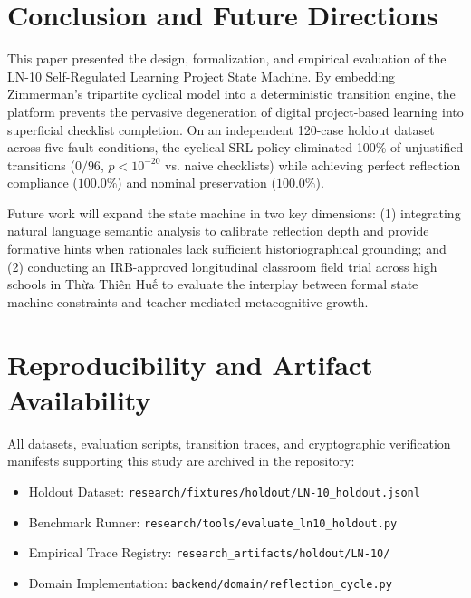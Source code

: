 \documentclass[11pt,a4paper]{article}
\begin{document}
\section{Conclusion and Future Directions}

This paper presented the design, formalization, and empirical evaluation of the LN-10 Self-Regulated Learning Project State Machine. By embedding Zimmerman's tripartite cyclical model into a deterministic transition engine, the platform prevents the pervasive degeneration of digital project-based learning into superficial checklist completion. On an independent 120-case holdout dataset across five fault conditions, the cyclical SRL policy eliminated 100\% of unjustified transitions ($0/96$, $p < 10^{-20}$ vs. naive checklists) while achieving perfect reflection compliance ($100.0\%$) and nominal preservation ($100.0\%$).

Future work will expand the state machine in two key dimensions: (1) integrating natural language semantic analysis to calibrate reflection depth and provide formative hints when rationales lack sufficient historiographical grounding; and (2) conducting an IRB-approved longitudinal classroom field trial across high schools in Thừa Thiên Huế to evaluate the interplay between formal state machine constraints and teacher-mediated metacognitive growth.

\section*{Reproducibility and Artifact Availability}
All datasets, evaluation scripts, transition traces, and cryptographic verification manifests supporting this study are archived in the repository:
\begin{itemize}
    \item Holdout Dataset: \texttt{research/fixtures/holdout/LN-10\_holdout.jsonl}
    \item Benchmark Runner: \texttt{research/tools/evaluate\_ln10\_holdout.py}
    \item Empirical Trace Registry: \texttt{research\_artifacts/holdout/LN-10/}
    \item Domain Implementation: \texttt{backend/domain/reflection\_cycle.py}
\end{itemize}
\end{document}
